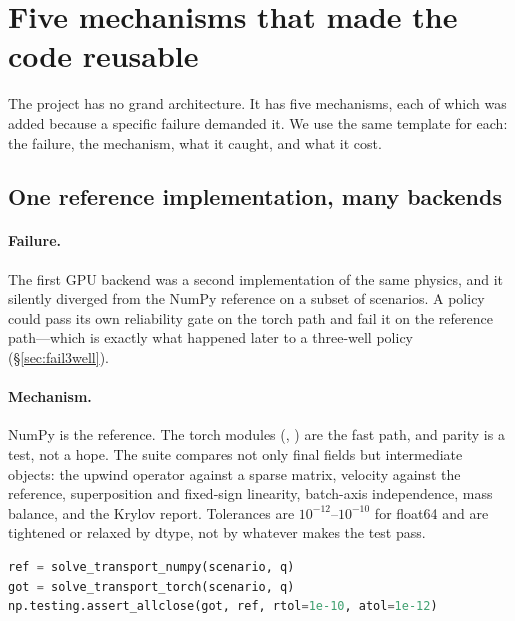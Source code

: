 \section{Five mechanisms that made the code reusable}
\label{sec:mechanisms}

The project has no grand architecture. It has five mechanisms, each of which
was added because a specific failure demanded it. We use the same template for
each: the failure, the mechanism, what it caught, and what it cost.

\subsection{One reference implementation, many backends}
\label{sec:parity}

\paragraph{Failure.} The first GPU backend was a second implementation of the
same physics, and it silently diverged from the NumPy reference on a subset of
scenarios. A policy could pass its own reliability gate on the torch path and
fail it on the reference path---which is exactly what happened later to a
three-well policy (\S\ref{sec:fail3well}).

\paragraph{Mechanism.} NumPy is the reference. The torch modules
(, ) are the fast path,
and parity is a test, not a hope. The suite compares not only final fields but
intermediate objects: the upwind operator against a sparse matrix, velocity
against the reference, superposition and fixed-sign linearity, batch-axis
independence, mass balance, and the Krylov report. Tolerances are
$10^{-12}$--$10^{-10}$ for float64 and are tightened or relaxed by dtype, not by
whatever makes the test pass.

\begin{lstlisting}[language=Python,caption={The parity pattern: the same scenario,
two backends, one assertion.},label={lst:parity}]
ref = solve_transport_numpy(scenario, q)
got = solve_transport_torch(scenario, q)
np.testing.assert_allclose(got, ref, rtol=1e-10, atol=1e-12)
\end{lstlisting}

